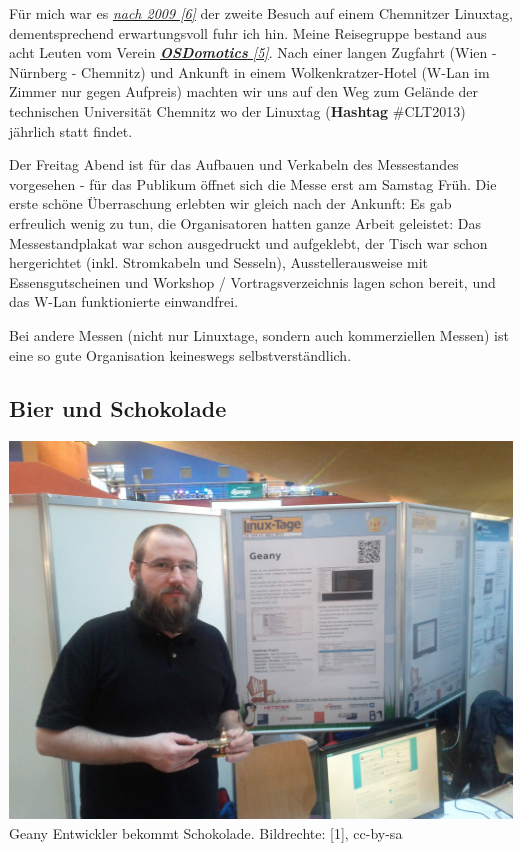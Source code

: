 Für mich war es \href{http://spielend-programmieren.at/de:sonstiges:alter_blog:2009:0318_chemnitzer_linux-tage_2009}{\textit{nach 2009 [6]}} der zweite Besuch auf einem Chemnitzer Linuxtag, dementsprechend erwartungsvoll fuhr ich hin. Meine Reisegruppe bestand aus acht Leuten vom Verein \href{http://osdomotics.com}{\textit{\textbf{OSDomotics} [5]}}. Nach einer langen Zugfahrt (Wien - Nürnberg - Chemnitz) und Ankunft in einem Wolkenkratzer-Hotel (W-Lan im Zimmer nur gegen Aufpreis) machten wir uns auf den Weg zum Gelände der technischen Universität Chemnitz wo der Linuxtag (\textbf{Hashtag} \#CLT2013) jährlich statt findet.

Der Freitag Abend ist für das Aufbauen und Verkabeln des Messestandes vorgesehen - für das Publikum öffnet sich die Messe erst am Samstag Früh. Die erste schöne Überraschung erlebten wir gleich nach der Ankunft: Es gab erfreulich wenig zu tun, die Organisatoren hatten ganze Arbeit geleistet: Das Messestandplakat war schon ausgedruckt und aufgeklebt, der Tisch war schon hergerichtet (inkl. Stromkabeln und Sesseln), Ausstellerausweise mit Essensgutscheinen und Workshop / Vortragsverzeichnis lagen schon bereit, und das W-Lan funktionierte einwandfrei. 

Bei andere Messen (nicht nur Linuxtage, sondern auch kommerziellen Messen) ist eine so gute Organisation keineswegs selbstverständlich.


\subsection*{Bier und Schokolade}

\begin{center}
\includegraphics[width=\linewidth]{chemnitz/chemnitz_geany1.jpg}
\footnotesize{Geany Entwickler bekommt Schokolade. Bildrechte: [1], cc-by-sa}
\end{center}

